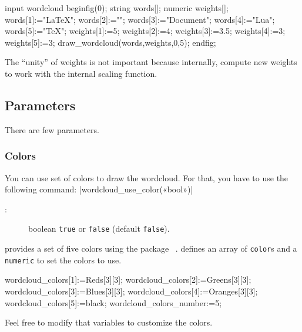 \documentclass[english]{ltxdoc}
\begin{document}
\begin{ExempleMP}
input wordcloud
beginfig(0);
string words[];
numeric weights[];
words[1]:="\LaTeX";
words[2]:="";
words[3]:="Document";
words[4]:="Lua";
words[5]:="\TeX";
weights[1]:=5;
weights[2]:=4;
weights[3]:=3.5;
weights[4]:=3;
weights[5]:=3;
draw_wordcloud(words,weights,0,5);
endfig;
\end{ExempleMP}

\begin{remark}
The ``unity'' of weights is not important because internally,
 compute new weights to work
with the internal scaling function.  
\end{remark}

\subsection{Parameters}

There are few parameters.

\subsubsection{Colors}\label{sec:colors}

You can use set of colors to draw the wordcloud. For that, you have to use the
following command:
\commande|wordcloud_use_color(«bool»)|\smallskip{}

\begin{description}
  \item[:] boolean \lstinline+true+ or \lstinline+false+ (default \lstinline+false+). 
\end{description}

 provides a set of five colors using the 
package ~\cite{ctan-metapost-colorbrewer}.
 defines an array of \lstinline+color+s and a
\lstinline+numeric+ to set the colors to use.
\begin{mpcode}
wordcloud_colors[1]:=Reds[3][3];
wordcloud_colors[2]:=Greens[3][3];
wordcloud_colors[3]:=Blues[3][3];
wordcloud_colors[4]:=Oranges[3][3];
wordcloud_colors[5]:=black;
wordcloud_colors_number:=5;
\end{mpcode} 
Feel free to modify that variables to customize the colors.
\end{document}
